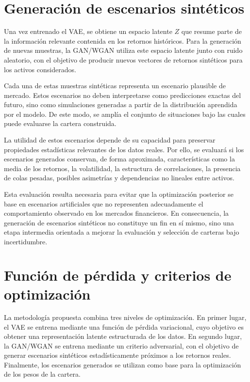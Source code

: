 \section{Generación de escenarios sintéticos}

Una vez entrenado el VAE, se obtiene un espacio latente $Z$ que resume parte de la información relevante contenida en los retornos históricos. Para la generación de nuevas muestras, la GAN/WGAN utiliza este espacio latente junto con ruido aleatorio, con el objetivo de producir nuevos vectores de retornos sintéticos para los activos considerados.

Cada una de estas muestras sintéticas representa un escenario plausible de mercado. Estos escenarios no deben interpretarse como predicciones exactas del futuro, sino como simulaciones generadas a partir de la distribución aprendida por el modelo. De este modo, se amplía el conjunto de situaciones bajo las cuales puede evaluarse la cartera construida.

La utilidad de estos escenarios depende de su capacidad para preservar propiedades estadísticas relevantes de los datos reales. Por ello, se evaluará si los escenarios generados conservan, de forma aproximada, características como la media de los retornos, la volatilidad, la estructura de correlaciones, la presencia de colas pesadas, posibles asimetrías y dependencias no lineales entre activos.

Esta evaluación resulta necesaria para evitar que la optimización posterior se base en escenarios artificiales que no representen adecuadamente el comportamiento observado en los mercados financieros. En consecuencia, la generación de escenarios sintéticos no constituye un fin en sí mismo, sino una etapa intermedia orientada a mejorar la evaluación y selección de carteras bajo incertidumbre.

\section{Función de pérdida y criterios de optimización}

La metodología propuesta combina tres niveles de optimización. En primer lugar, el VAE se entrena mediante una función de pérdida variacional, cuyo objetivo es obtener una representación latente estructurada de los datos. En segundo lugar, la GAN/WGAN se entrena mediante un criterio adversarial, con el objetivo de generar escenarios sintéticos estadísticamente próximos a los retornos reales. Finalmente, los escenarios generados se utilizan como base para la optimización de los pesos de la cartera.

